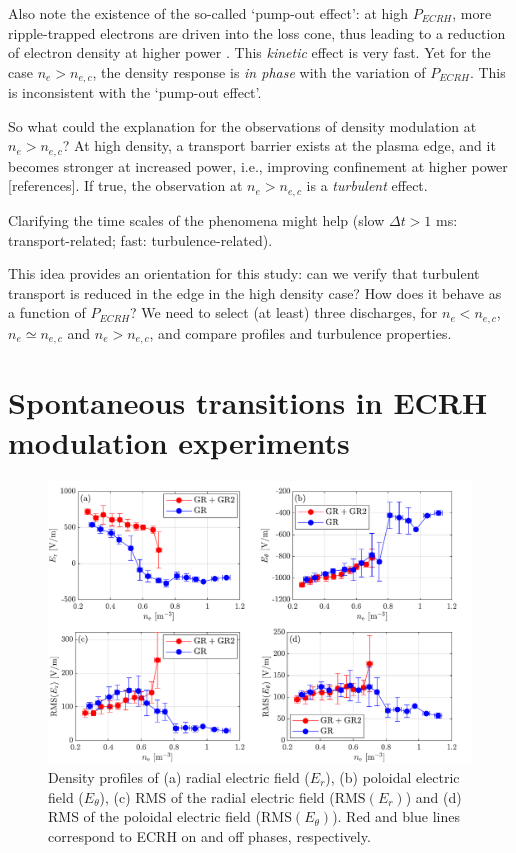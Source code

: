 \documentclass[preprint,12pt,authoryear]{elsarticle}
\begin{document}
Also note the existence of the so-called `pump-out effect': at high $P_{ECRH}$, more ripple-trapped electrons are driven into the loss cone, thus leading to a reduction of electron density at higher power \cite{Castejon:2008}. This {\em kinetic} effect is very fast.
Yet for the case $n_e > n_{e,c}$, the density response is {\em in phase} with the variation of $P_{ECRH}$.
This is inconsistent with the `pump-out effect'.

So what could the explanation for the observations of density modulation at $n_e > n_{e,c}$?
At high density, a transport barrier exists at the plasma edge, and it becomes stronger at increased power, i.e., improving confinement at higher power [references]. If true, the observation at $n_e > n_{e,c}$  is a {\em turbulent} effect. 

Clarifying the time scales of the phenomena might help (slow $\Delta t > 1$ ms: transport-related; fast: turbulence-related).

This idea provides an orientation for this study: can we verify that turbulent transport is reduced in the edge in the high density case? How does it behave as a function of $P_{ECRH}$? We need to select (at least) three discharges, for $n_e < n_{e,c}$, $n_e \simeq n_{e,c}$ and $n_e > n_{e,c}$, and compare profiles and turbulence properties.


\section{Spontaneous transitions in ECRH modulation experiments}

\begin{figure}[!ht]

   \includegraphics[width=1.0\columnwidth]{Images/transition_1.pdf}
   \caption{Density profiles of (a) radial electric field ($E_{r}$), (b) poloidal electric field ($E_{\theta}$), (c) RMS of the radial electric field 
   ($\mathrm{RMS}(E_{r})$) and (d) RMS of the poloidal electric field ($\mathrm{RMS}(E_{\theta})$). Red and blue lines correspond to ECRH on and off 
   phases, respectively.}
   \label{Fig:transition_1}
\end{figure}
\end{document}
